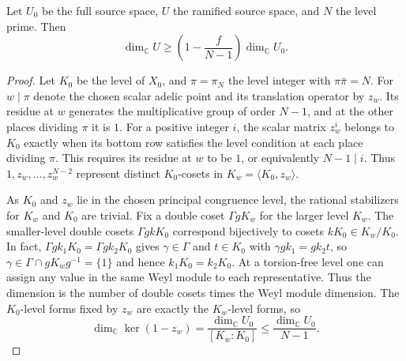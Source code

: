 \begin{lemma}
\label{lem:a-ramified-dimension}
\emitthmsource
Let $U_0$ be the full source space, $U$ the ramified source space, and $N$ the level prime. Then
\[
 \dim_{\mathbb C}U\ge
 \left(1-\frac{f}{N-1}\right)\dim_{\mathbb C}U_0 .
\]
\end{lemma}
\begin{proof}
Let $K_0$ be the level of $X_0$, and $\pi=\pi_N$ the level integer with $\pi\bar\pi=N$. For $w\mid\pi$ denote the chosen scalar adelic point and its translation operator by $z_w$. Its residue at $w$ generates the multiplicative group of order $N-1$, and at the other places dividing $\pi$ it is $1$. For a positive integer $i$, the scalar matrix $z_w^i$ belongs to $K_0$ exactly when its bottom row satisfies the level condition at each place dividing $\pi$. This requires its residue at $w$ to be $1$, or equivalently $N-1\mid i$. Thus $1,z_w,\dots,z_w^{N-2}$ represent distinct $K_0$-cosets in $K_w=\langle K_0,z_w\rangle$.

As $K_0$ and $z_w$ lie in the chosen principal congruence level, the rational stabilizers for $K_w$ and $K_0$ are trivial. Fix a double coset $\Gamma gK_w$ for the larger level $K_w$. The smaller-level double cosets $\Gamma gkK_0$ correspond bijectively to cosets $kK_0\in K_w/K_0$. In fact, $\Gamma gk_1K_0=\Gamma gk_2K_0$ gives $\gamma\in\Gamma$ and $t\in K_0$ with $\gamma gk_1=gk_2t$, so $\gamma\in\Gamma\cap gK_wg^{-1}=\{1\}$ and hence $k_1K_0=k_2K_0$. At a torsion-free level one can assign any value in the same Weyl module to each representative. Thus the dimension is the number of double cosets times the Weyl module dimension. The $K_0$-level forms fixed by $z_w$ are exactly the $K_w$-level forms, so
\[
 \dim_{\mathbb C}\ker(1-z_w)
 =\frac{\dim_{\mathbb C}U_0}{[K_w:K_0]}
 \le \frac{\dim_{\mathbb C}U_0}{N-1}.
\]


\end{proof}

